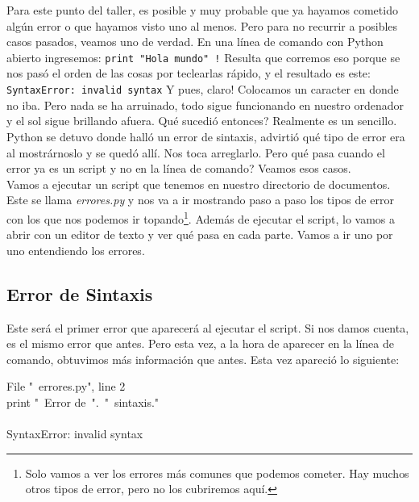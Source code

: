 \documentclass[10pt,letterpaper]{article}
\newcommand{\inlinecode}[1]{
\colorbox{light-gray}{\texttt{#1}}
}
\newenvironment{Code}
{
\begin{lrbox}{\selvestebox}%
\begin{minipage}{\dimexpr\columnwidth-2\fboxsep\relax}
\fontfamily{\ttdefault}\selectfont
}
{\end{minipage}\end{lrbox}%
\begin{center}
\colorbox{light-gray}{\usebox{\selvestebox}}
\end{center}
}
\begin{document}
Para este punto del taller, es posible y muy probable que ya hayamos cometido alg\'un error o que hayamos visto uno al menos. Pero para no recurrir a posibles casos pasados, veamos uno de verdad. En una l\'inea de comando con Python abierto ingresemos: \inlinecode{print "Hola mundo"\ \hspace{-2mm}!} Resulta que corremos eso porque se nos pas\'o el orden de las cosas por teclearlas r\'apido, y el resultado es este: \inlinecode{\color{red} SyntaxError: invalid syntax} Y pues, claro! Colocamos un caracter en donde no iba. Pero nada se ha arruinado, todo sigue funcionando en nuestro ordenador y el sol sigue brillando afuera. Qu\'e sucedi\'o entonces? Realmente es un sencillo. Python se detuvo donde hall\'o un error de sintaxis, advirti\'o qu\'e tipo de error era al mostr\'arnoslo y se qued\'o all\'i. Nos toca arreglarlo. Pero qu\'e pasa cuando el error ya es un script y no en la l\'inea de comando? Veamos esos casos.\\

Vamos a ejecutar un script que tenemos en nuestro directorio de documentos. Este se llama \textit{errores.py} y nos va a ir mostrando paso a paso los tipos de error con los que nos podemos ir topando\footnote{Solo vamos a ver los errores m\'as comunes que podemos cometer. Hay muchos otros tipos de error, pero no los cubriremos aqu\'i.}. Adem\'as de ejecutar el script, lo vamos a abrir con un editor de texto y ver qu\'e pasa en cada parte. Vamos a ir uno por uno entendiendo los errores.\\

\subsection{Error de Sintaxis}
Este ser\'a el primer error que aparecer\'a al ejecutar el script. Si nos damos cuenta, es el mismo error que antes. Pero esta vez, a la hora de aparecer en la l\'inea de comando, obtuvimos m\'as informaci\'on que antes. Esta vez apareci\'o lo siguiente:

\begin{Code}
{\color{red} \hspace*{4mm} File "\ \hspace{-2mm}errores.py", line 2\\
\hspace*{8mm} print "\ \hspace{-2mm}Error de\ ".\ "\ \hspace{-2mm}sintaxis."\\
\hspace*{63mm}\^\\
SyntaxError: invalid syntax}
\end{Code}
\end{document}
